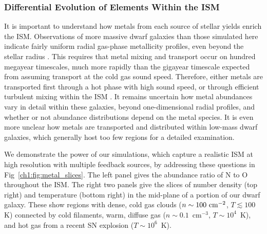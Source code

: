 \subsubsection{Differential Evolution of Elements Within the ISM}
It is important to understand how metals from each source of stellar yields enrich the ISM. Observations of more massive dwarf galaxies than those simulated here indicate fairly uniform radial gas-phase metallicity profiles, even beyond the stellar radius \citep[e.g.][]{Werk2011,Belfiore2017}. This requires that metal mixing and transport occur on hundred megayear timescales, much more rapidly than the gigayear timescale expected from assuming transport at the cold gas sound speed. Therefore, either metals are transported first through a hot phase with high sound speed, or through efficient turbulent mixing within the ISM \citep[e.g.][]{Avillez2002,Tassis2008,YangKrumholz2012}. It remains uncertain how metal abundances vary in detail within these galaxies, beyond one-dimensional radial profiles, and whether or not abundance distributions depend on the metal species. It is even more unclear how metals are transported and distributed within low-mass dwarf galaxies, which generally host too few  regions for a detailed examination.

We demonstrate the power of our simulations, which capture a realistic ISM at high resolution with multiple feedback sources, by addressing these questions in Fig~\ref{ch1:fig:metal_slices}. The left panel gives the abundance ratio of N to O throughout the ISM. The right
two panels give the slices of number density (top right) and temperature (bottom right) in the mid-plane of a portion of our dwarf galaxy. These show regions with dense, cold gas clouds ($n \sim 100~\rm{cm}^{-2}$, $T \lesssim 100~$K) connected by cold filaments, warm, diffuse gas ($n\sim 0.1$~cm$^{-3}$, $T\sim 10^{4}$~K), and hot gas from a recent SN explosion ($T\sim10^{6}$~K).

